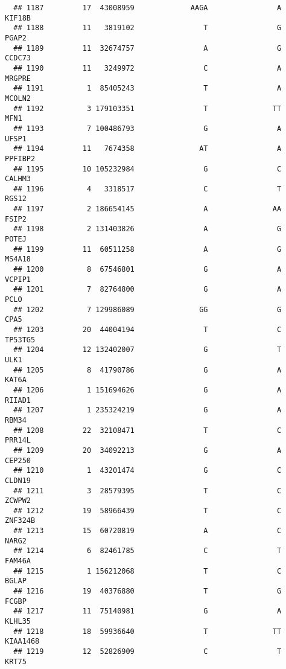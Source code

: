 \documentclass[12pt,twoside]{reedthesis}
\theoremstyle{definition}
\theoremstyle{definition}
\theoremstyle{remark}
\begin{document}
\begin{verbatim}
  ## 1187         17  43008959             AAGA                A         KIF18B
  ## 1188         11   3819102                T                G          PGAP2
  ## 1189         11  32674757                A                G         CCDC73
  ## 1190         11   3249972                C                A         MRGPRE
  ## 1191          1  85405243                T                A         MCOLN2
  ## 1192          3 179103351                T               TT           MFN1
  ## 1193          7 100486793                G                A          UFSP1
  ## 1194         11   7674358               AT                A        PPFIBP2
  ## 1195         10 105232984                G                C         CALHM3
  ## 1196          4   3318517                C                T          RGS12
  ## 1197          2 186654145                A               AA          FSIP2
  ## 1198          2 131403826                A                G          POTEJ
  ## 1199         11  60511258                A                G         MS4A18
  ## 1200          8  67546801                G                A         VCPIP1
  ## 1201          7  82764800                G                A           PCLO
  ## 1202          7 129986089               GG                G           CPA5
  ## 1203         20  44004194                T                C        TP53TG5
  ## 1204         12 132402007                G                T           ULK1
  ## 1205          8  41790786                G                A          KAT6A
  ## 1206          1 151694626                G                A         RIIAD1
  ## 1207          1 235324219                G                A          RBM34
  ## 1208         22  32108471                T                C         PRR14L
  ## 1209         20  34092213                G                A         CEP250
  ## 1210          1  43201474                G                C         CLDN19
  ## 1211          3  28579395                T                C         ZCWPW2
  ## 1212         19  58966439                T                C        ZNF324B
  ## 1213         15  60720819                A                C          NARG2
  ## 1214          6  82461785                C                T         FAM46A
  ## 1215          1 156212068                T                C          BGLAP
  ## 1216         19  40376880                T                G          FCGBP
  ## 1217         11  75140981                G                A         KLHL35
  ## 1218         18  59936640                T               TT       KIAA1468
  ## 1219         12  52826909                C                T          KRT75

\end{verbatim}
\end{document}
